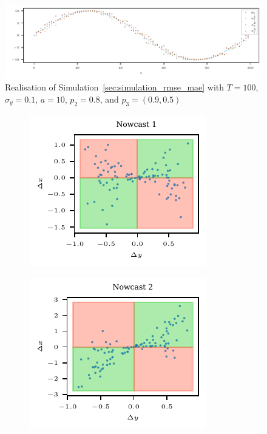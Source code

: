 \documentclass[oneside]{article}
\theoremstyle{plain}%
\theoremstyle{definition}
\begin{document}
\begin{figure}
  \centering
  \includegraphics{plots/simulation_same_rmse_mae/time_series.pdf}
  \caption{Realisation of Simulation~\ref{sec:simulation_rmse_mae} with $T = 100$, $\sigma_y=0.1$, $a = 10$, $p_2 = 0.8$, and $p_3 = (0.9, 0.5)$}
  \label{fig:simulation_rmse_mae_ts}
\end{figure}

\begin{figure}
  \centering
  \begin{subfigure}{.32\textwidth}
  	\includegraphics{plots/simulation_same_rmse_mae/4q_plot_1}
  \end{subfigure}
  \begin{subfigure}{.32\textwidth}
  	\includegraphics{plots/simulation_same_rmse_mae/4q_plot_2}
  \end{subfigure}
    \begin{subfigure}{.32\textwidth}

\end{subfigure}
\end{figure}
\end{document}
